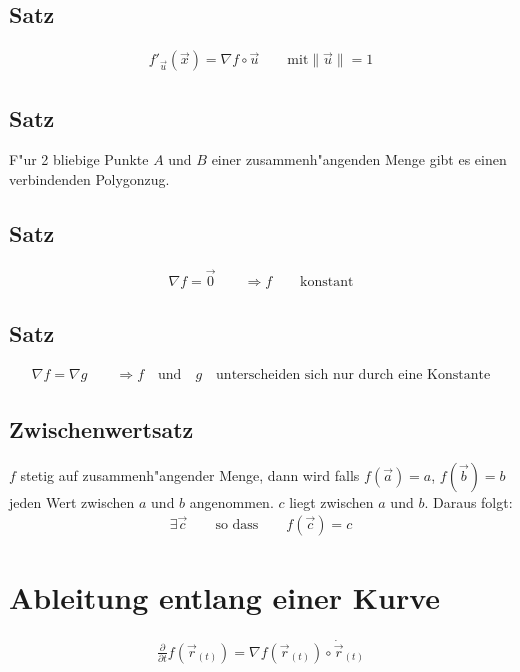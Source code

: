 \subsection{Satz}
\begin{gather}
  f'_{\overrightarrow{u}}(\overrightarrow{x}) = \nabla f \circ\overrightarrow{u}\qquad\text{mit}\|\overrightarrow{u}\|=1
\end{gather}

\subsection{Satz}
F"ur 2 bliebige Punkte $A$ und $B$ einer zusammenh"angenden Menge gibt es einen verbindenden Polygonzug.

\subsection{Satz}
\begin{gather}
	\nabla f = \overrightarrow{0} \qquad\Longrightarrow f \qquad\text{konstant}
\end{gather}

\subsection{Satz}
\begin{gather}
	\nabla f = \nabla g \qquad\Longrightarrow f \quad\text{und}\quad g\quad\text{unterscheiden sich nur durch eine Konstante}
\end{gather}

\subsection{Zwischenwertsatz}
$f$ stetig auf zusammenh"angender Menge, dann wird falls $f(\overrightarrow{a}) = a$, $f(\overrightarrow{b}) = b$ jeden
Wert zwischen $a$ und $b$ angenommen. $c$ liegt zwischen $a$ und $b$. Daraus folgt:
\begin{gather}
	\exists \overrightarrow{c}\qquad\text{so dass}\qquad f(\overrightarrow{c}) = c
\end{gather}

\section{Ableitung entlang einer Kurve}
\begin{gather}
	\frac{\partial}{\partial t}f(\overrightarrow{r}_{(t)}) = \nabla f(\overrightarrow{r}_{(t)})\circ\dot{\overrightarrow{r}}_{(t)}
\end{gather}

